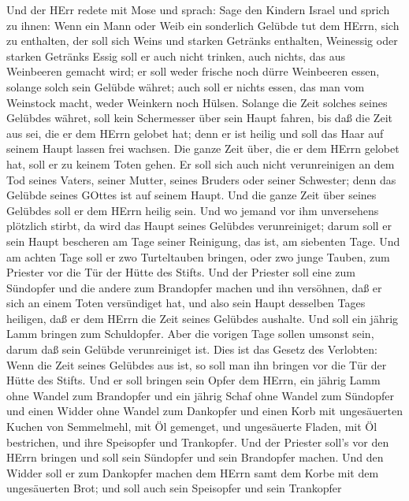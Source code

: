  Und der HErr redete mit Mose und sprach:  Sage
den Kindern Israel und sprich zu ihnen: Wenn ein Mann oder Weib ein
sonderlich Gelübde tut dem HErrn, sich zu enthalten,  der
soll sich Weins und starken Getränks enthalten, Weinessig oder starken
Getränks Essig soll er auch nicht trinken, auch nichts, das aus
Weinbeeren gemacht wird; er soll weder frische noch dürre Weinbeeren
essen,  solange solch sein Gelübde währet; auch soll er
nichts essen, das man vom Weinstock macht, weder Weinkern noch Hülsen.
 Solange die Zeit solches seines Gelübdes währet, soll kein
Schermesser über sein Haupt fahren, bis daß die Zeit aus sei, die er dem
HErrn gelobet hat; denn er ist heilig und soll das Haar auf seinem Haupt
lassen frei wachsen.  Die ganze Zeit über, die er dem HErrn
gelobet hat, soll er zu keinem Toten gehen.  Er soll sich
auch nicht verunreinigen an dem Tod seines Vaters, seiner Mutter, seines
Bruders oder seiner Schwester; denn das Gelübde seines GOttes ist auf
seinem Haupt.  Und die ganze Zeit über seines Gelübdes soll
er dem HErrn heilig sein.  Und wo jemand vor ihm unversehens
plötzlich stirbt, da wird das Haupt seines Gelübdes verunreiniget; darum
soll er sein Haupt bescheren am Tage seiner Reinigung, das ist, am
siebenten Tage.  Und am achten Tage soll er zwo
Turteltauben bringen, oder zwo junge Tauben, zum Priester vor die Tür
der Hütte des Stifts.  Und der Priester soll eine zum
Sündopfer und die andere zum Brandopfer machen und ihn versöhnen, daß er
sich an einem Toten versündiget hat, und also sein Haupt desselben Tages
heiligen,  daß er dem HErrn die Zeit seines Gelübdes
aushalte. Und soll ein jährig Lamm bringen zum Schuldopfer. Aber die
vorigen Tage sollen umsonst sein, darum daß sein Gelübde verunreiniget
ist.  Dies ist das Gesetz des Verlobten: Wenn die Zeit
seines Gelübdes aus ist, so soll man ihn bringen vor die Tür der Hütte
des Stifts.  Und er soll bringen sein Opfer dem HErrn, ein
jährig Lamm ohne Wandel zum Brandopfer und ein jährig Schaf ohne Wandel
zum Sündopfer und einen Widder ohne Wandel zum Dankopfer 
und einen Korb mit ungesäuerten Kuchen von Semmelmehl, mit Öl gemenget,
und ungesäuerte Fladen, mit Öl bestrichen, und ihre Speisopfer und
Trankopfer.  Und der Priester soll's vor den HErrn bringen
und soll sein Sündopfer und sein Brandopfer machen.  Und
den Widder soll er zum Dankopfer machen dem HErrn samt dem Korbe mit dem
ungesäuerten Brot; und soll auch sein Speisopfer und sein Trankopfer
